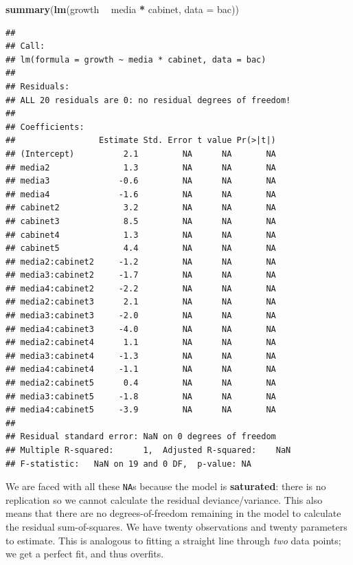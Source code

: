 \documentclass[]{book}
\newenvironment{Shaded}{\begin{snugshade}}{\end{snugshade}}
\newcommand{\KeywordTok}[1]{\textcolor[rgb]{0.13,0.29,0.53}{\textbf{#1}}}
\newcommand{\DataTypeTok}[1]{\textcolor[rgb]{0.13,0.29,0.53}{#1}}
\newcommand{\StringTok}[1]{\textcolor[rgb]{0.31,0.60,0.02}{#1}}
\newcommand{\OperatorTok}[1]{\textcolor[rgb]{0.81,0.36,0.00}{\textbf{#1}}}
\newcommand{\NormalTok}[1]{#1}
\theoremstyle{definition}
\theoremstyle{definition}
\theoremstyle{definition}
\theoremstyle{remark}
\begin{document}
\begin{Shaded}
\begin{Highlighting}[]
\KeywordTok{summary}\NormalTok{(}\KeywordTok{lm}\NormalTok{(growth }\OperatorTok{~}\StringTok{ }\NormalTok{media }\OperatorTok{*}\StringTok{ }\NormalTok{cabinet, }\DataTypeTok{data =}\NormalTok{ bac))}
\end{Highlighting}
\end{Shaded}

\begin{verbatim}
## 
## Call:
## lm(formula = growth ~ media * cabinet, data = bac)
## 
## Residuals:
## ALL 20 residuals are 0: no residual degrees of freedom!
## 
## Coefficients:
##                 Estimate Std. Error t value Pr(>|t|)
## (Intercept)          2.1         NA      NA       NA
## media2               1.3         NA      NA       NA
## media3              -0.6         NA      NA       NA
## media4              -1.6         NA      NA       NA
## cabinet2             3.2         NA      NA       NA
## cabinet3             8.5         NA      NA       NA
## cabinet4             1.3         NA      NA       NA
## cabinet5             4.4         NA      NA       NA
## media2:cabinet2     -1.2         NA      NA       NA
## media3:cabinet2     -1.7         NA      NA       NA
## media4:cabinet2     -2.2         NA      NA       NA
## media2:cabinet3      2.1         NA      NA       NA
## media3:cabinet3     -2.0         NA      NA       NA
## media4:cabinet3     -4.0         NA      NA       NA
## media2:cabinet4      1.1         NA      NA       NA
## media3:cabinet4     -1.3         NA      NA       NA
## media4:cabinet4     -1.1         NA      NA       NA
## media2:cabinet5      0.4         NA      NA       NA
## media3:cabinet5     -1.8         NA      NA       NA
## media4:cabinet5     -3.9         NA      NA       NA
## 
## Residual standard error: NaN on 0 degrees of freedom
## Multiple R-squared:      1,  Adjusted R-squared:    NaN 
## F-statistic:   NaN on 19 and 0 DF,  p-value: NA
\end{verbatim}

We are faced with all these \texttt{NA}s because the model is
\textbf{saturated}: there is no replication so we cannot calculate the
residual deviance/variance. This also means that there are no
degrees-of-freedom remaining in the model to calculate the residual
sum-of-squares. We have twenty observations and twenty parameters to
estimate. This is analogous to fitting a straight line through
\emph{two} data points; we get a perfect fit, and thus overfits.
\end{document}
